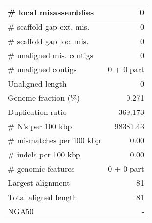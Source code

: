 \documentclass[12pt,a4paper]{article}
\begin{document}
\begin{table}[ht]
\begin{center}
\begin{tabular}{|l*{1}{|r}|}
\# local misassemblies & 0 \\ \hline
\# scaffold gap ext. mis. & 0 \\ \hline
\# scaffold gap loc. mis. & 0 \\ \hline
\# unaligned mis. contigs & 0 \\ \hline
\# unaligned contigs & 0 + 0 part \\ \hline
Unaligned length & 0 \\ \hline
Genome fraction (\%) & 0.271 \\ \hline
Duplication ratio & 369.173 \\ \hline
\# N's per 100 kbp & 98381.43 \\ \hline
\# mismatches per 100 kbp & 0.00 \\ \hline
\# indels per 100 kbp & 0.00 \\ \hline
\# genomic features & 0 + 0 part \\ \hline
Largest alignment & 81 \\ \hline
Total aligned length & 81 \\ \hline
NGA50 & - \\ \hline
\end{tabular}
\end{center}
\end{table}
\end{document}
